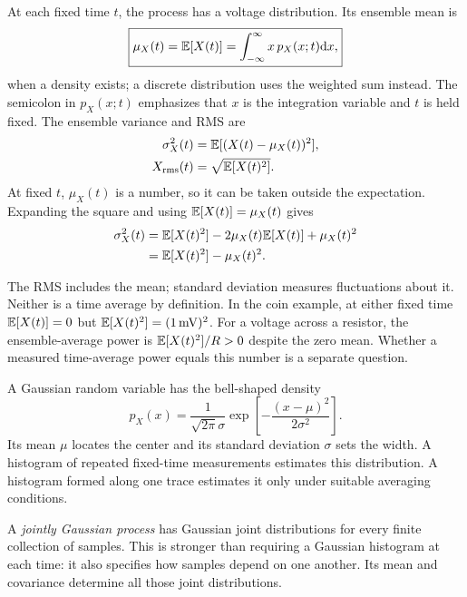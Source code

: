 At each fixed time $t$, the process has a voltage distribution. Its ensemble mean is
\begin{equation}
\boxed{\mu_X(t)=\mathbb E[X(t)]=\int_{-\infty}^{\infty}x\,p_X(x;t)\mathrm d x,}
\end{equation}
when a density exists; a discrete distribution uses the weighted sum instead. The semicolon in $p_X(x;t)$ emphasizes that $x$ is the integration variable and $t$ is held fixed.
The ensemble variance and RMS are
\begin{align}
\sigma_X^2(t)&=\mathbb E[(X(t)-\mu_X(t))^2],\\
X_{\mathrm{rms}}(t)&=\sqrt{\mathbb E[X(t)^2]}.
\end{align}
At fixed $t$, $\mu_X(t)$ is a number, so it can be taken outside the expectation. Expanding the square and using $\mathbb E[X(t)]=\mu_X(t)$ gives
\begin{align}
\sigma_X^2(t)&=\mathbb E[X(t)^2]-2\mu_X(t)\mathbb E[X(t)]+\mu_X(t)^2\notag\\
&=\mathbb E[X(t)^2]-\mu_X(t)^2.
\label{eq:variance}
\end{align}

The RMS includes the mean; standard deviation measures fluctuations about it. Neither is a time average by definition. In the coin example, at either fixed time $\mathbb E[X(t)]=0$ but $\mathbb E[X(t)^2]=(1\,\mathrm{mV})^2$. For a voltage across a resistor, the ensemble-average power is $\mathbb E[X(t)^2]/R>0$ despite the zero mean. Whether a measured time-average power equals this number is a separate question.

\begin{insight}[title={A Gaussian model describes the voltage distribution}]
A Gaussian random variable has the bell-shaped density
\[
p_X(x)=\frac{1}{\sqrt{2\pi}\sigma}
\exp\!\left[-\frac{(x-\mu)^2}{2\sigma^2}\right].
\]
Its mean $\mu$ locates the center and its standard deviation $\sigma$ sets the width. A histogram of repeated fixed-time measurements estimates this distribution. A histogram formed along one trace estimates it only under suitable averaging conditions.

A \emph{jointly Gaussian process} has Gaussian joint distributions for every finite collection of samples. This is stronger than requiring a Gaussian histogram at each time: it also specifies how samples depend on one another. Its mean and covariance determine all those joint distributions.
\end{insight}

